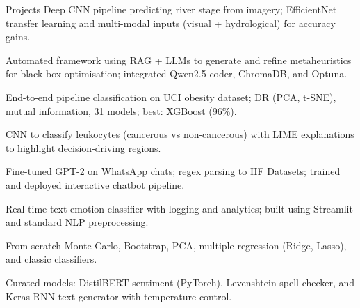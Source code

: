 \begin{rubricnorepeat}{Projects}
Deep CNN pipeline predicting river stage from imagery; EfficientNet transfer learning and multi-modal inputs (visual + hydrological) for accuracy gains.\hfill \href{https://github.com/musel25/research_deep_learning}{\faGithub}

Automated framework using RAG + LLMs to generate and refine metaheuristics for black-box optimisation; integrated Qwen2.5-coder, ChromaDB, and Optuna.\hfill \href{https://github.com/musel25/llm-metaheuristics}{\faGithub}

End-to-end pipeline classification on UCI obesity dataset; DR (PCA, t-SNE), mutual information, 31 models; best: XGBoost (96\%).\hfill \href{https://github.com/musel25/obesity_ml}{\faGithub}

CNN to classify leukocytes (cancerous vs non-cancerous) with LIME explanations to highlight decision-driving regions.

Fine-tuned GPT-2 on WhatsApp chats; regex parsing to HF Datasets; trained and deployed interactive chatbot pipeline.\hfill \href{https://github.com/musel25/her_if_it_was_2025}{\faGithub}

Real-time text emotion classifier with logging and analytics; built using Streamlit and standard NLP preprocessing.\hfill \href{https://github.com/musel25/nlp_project}{\faGithub}

From-scratch Monte Carlo, Bootstrap, PCA, multiple regression (Ridge, Lasso), and classic classifiers.
\hfill 
\href{https://github.com/musel25/Advanced_Machine_Learning}{\faGithub}

Curated models: DistilBERT sentiment (PyTorch), Levenshtein spell checker, and Keras RNN text generator with temperature control.
\hfill 
\href{https://github.com/musel25/nlp_projects}{\faGithub}

\end{rubricnorepeat}
